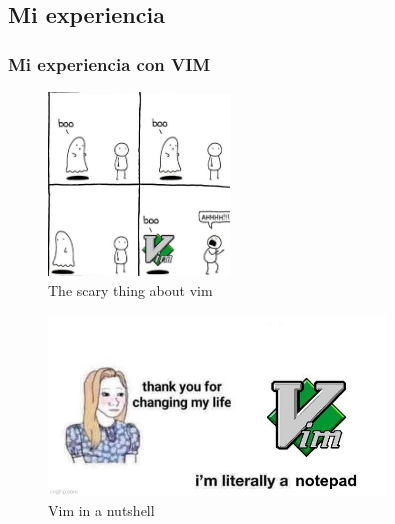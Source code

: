 \documentclass{beamer}
\begin{document}
  \subsection{Mi experiencia}
  \begin{frame}[t]
    \frametitle{Mi experiencia con VIM}
    \begin{figure}[h]
      \centering
      \includegraphics[width=0.43\textwidth]{./resources/3.png}
      \caption{The scary thing about vim}
      \label{fig:5}
    \end{figure}
  \end{frame}

  \begin{frame}[t]
    \begin{figure}[h]
      \centering
      \includegraphics[width=0.8\textwidth]{./resources/7.png}
      \caption{Vim in a nutshell}
      \label{fig:3}
    \end{figure}
  \end{frame}
  
\end{document}
